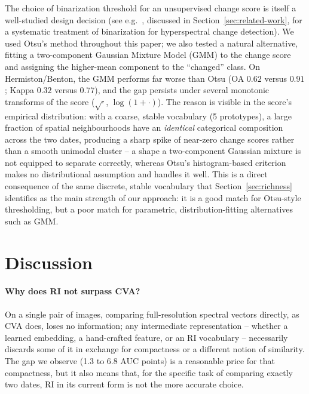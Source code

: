 \documentclass[11pt]{article}
\begin{document}
The choice of binarization threshold for an unsupervised change score is itself a well-studied design decision (see e.g.\ \citealp{falini2022rsb}, discussed in Section~\ref{sec:related-work}, for a systematic treatment of binarization for hyperspectral change detection). We used Otsu's method throughout this paper; we also tested a natural alternative, fitting a two-component Gaussian Mixture Model (GMM) to the change score and assigning the higher-mean component to the ``changed'' class. On Hermiston/Benton, the GMM performs far worse than Otsu (OA $0.62$ versus $0.91$; Kappa $0.32$ versus $0.77$), and the gap persists under several monotonic transforms of the score ($\sqrt{\cdot}$, $\log(1+\cdot)$). The reason is visible in the score's empirical distribution: with a coarse, stable vocabulary (5 prototypes), a large fraction of spatial neighbourhoods have an \emph{identical} categorical composition across the two dates, producing a sharp spike of near-zero change scores rather than a smooth unimodal cluster -- a shape a two-component Gaussian mixture is not equipped to separate correctly, whereas Otsu's histogram-based criterion makes no distributional assumption and handles it well. This is a direct consequence of the same discrete, stable vocabulary that Section~\ref{sec:richness} identifies as the main strength of our approach: it is a good match for Otsu-style thresholding, but a poor match for parametric, distribution-fitting alternatives such as GMM.

\section{Discussion}

\paragraph{Why does RI not surpass CVA?} On a single pair of images, comparing full-resolution spectral vectors directly, as CVA does, loses no information; any intermediate representation -- whether a learned embedding, a hand-crafted feature, or an RI vocabulary -- necessarily discards some of it in exchange for compactness or a different notion of similarity. The gap we observe (1.3 to 6.8 AUC points) is a reasonable price for that compactness, but it also means that, for the specific task of comparing exactly two dates, RI in its current form is not the more accurate choice.
\end{document}
